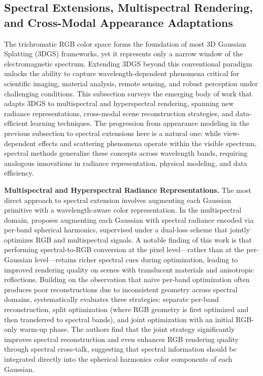 \documentclass[11pt]{article}
\begin{document}
\subsection{Spectral Extensions, Multispectral Rendering, and Cross-Modal Appearance Adaptations}

The trichromatic RGB color space forms the foundation of most 3D Gaussian Splatting (3DGS) frameworks, yet it represents only a narrow window of the electromagnetic spectrum. Extending 3DGS beyond this conventional paradigm unlocks the ability to capture wavelength-dependent phenomena critical for scientific imaging, material analysis, remote sensing, and robust perception under challenging conditions. This subsection surveys the emerging body of work that adapts 3DGS to multispectral and hyperspectral rendering, spanning new radiance representations, cross-modal scene reconstruction strategies, and data-efficient learning techniques. The progression from appearance modeling in the previous subsection to spectral extensions here is a natural one: while view-dependent effects and scattering phenomena operate within the visible spectrum, spectral methods generalize these concepts across wavelength bands, requiring analogous innovations in radiance representation, physical modeling, and data efficiency.

\textbf{Multispectral and Hyperspectral Radiance Representations.} The most direct approach to spectral extension involves augmenting each Gaussian primitive with a wavelength-aware color representation. In the multispectral domain, \cite{ref614} proposes augmenting each Gaussian with spectral radiance encoded via per-band spherical harmonics, supervised under a dual-loss scheme that jointly optimizes RGB and multispectral signals. A notable finding of this work is that performing spectral-to-RGB conversion at the pixel level---rather than at the per-Gaussian level---retains richer spectral cues during optimization, leading to improved rendering quality on scenes with translucent materials and anisotropic reflections. Building on the observation that naive per-band optimization often produces poor reconstructions due to inconsistent geometry across spectral domains, \cite{ref615} systematically evaluates three strategies: separate per-band reconstruction, split optimization (where RGB geometry is first optimized and then transferred to spectral bands), and joint optimization with an initial RGB-only warm-up phase. The authors find that the joint strategy significantly improves spectral reconstruction and even enhances RGB rendering quality through spectral cross-talk, suggesting that spectral information should be integrated directly into the spherical harmonics color components of each Gaussian.
\end{document}
